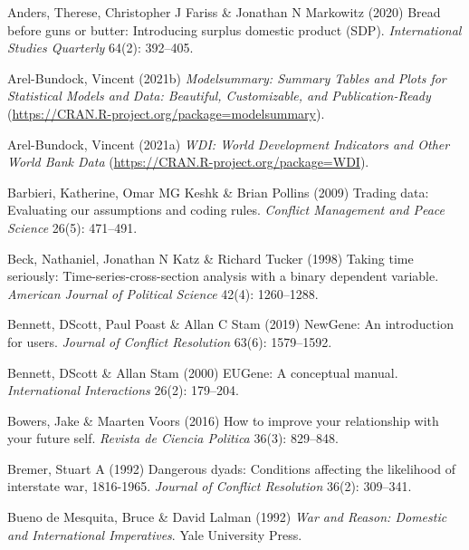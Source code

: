 \documentclass[
  11pt,
]{article}
\newlength{\cslhangindent}
\newenvironment{CSLReferences}[2] %
 {%
  \setlength{\parindent}{0pt}
  \ifodd #1 \everypar{\setlength{\hangindent}{\cslhangindent}}\ignorespaces\fi
  \ifnum #2 > 0
  \setlength{\parskip}{#2\baselineskip}
  \fi
 }%
 {}
\begin{document}
\hypertarget{refs}{}
\begin{CSLReferences}{1}{0}
\leavevmode{}%
Anders, Therese, Christopher J Fariss \& Jonathan N Markowitz (2020) Bread before guns or butter: Introducing surplus domestic product (SDP). \emph{International Studies Quarterly} 64(2): 392--405.

\leavevmode{}%
Arel-Bundock, Vincent (2021b) \emph{Modelsummary: Summary Tables and Plots for Statistical Models and Data: Beautiful, Customizable, and Publication-Ready} (\url{https://CRAN.R-project.org/package=modelsummary}).

\leavevmode{}%
Arel-Bundock, Vincent (2021a) \emph{WDI: World Development Indicators and Other World Bank Data} (\url{https://CRAN.R-project.org/package=WDI}).

\leavevmode{}%
Barbieri, Katherine, Omar MG Keshk \& Brian Pollins (2009) Trading data: Evaluating our assumptions and coding rules. \emph{Conflict Management and Peace Science} 26(5): 471--491.

\leavevmode{}%
Beck, Nathaniel, Jonathan N Katz \& Richard Tucker (1998) Taking time seriously: Time-series-cross-section analysis with a binary dependent variable. \emph{American Journal of Political Science} 42(4): 1260--1288.

\leavevmode{}%
Bennett, DScott, Paul Poast \& Allan C Stam (2019) NewGene: An introduction for users. \emph{Journal of Conflict Resolution} 63(6): 1579--1592.

\leavevmode{}%
Bennett, DScott \& Allan Stam (2000) EUGene: A conceptual manual. \emph{International Interactions} 26(2): 179--204.

\leavevmode{}%
Bowers, Jake \& Maarten Voors (2016) How to improve your relationship with your future self. \emph{Revista de Ciencia Politica} 36(3): 829--848.

\leavevmode{}%
Bremer, Stuart A (1992) Dangerous dyads: Conditions affecting the likelihood of interstate war, 1816-1965. \emph{Journal of Conflict Resolution} 36(2): 309--341.

\leavevmode{}%
Bueno de Mesquita, Bruce \& David Lalman (1992) \emph{War and Reason: Domestic and International Imperatives}. Yale University Press.


\end{CSLReferences}
\end{document}
